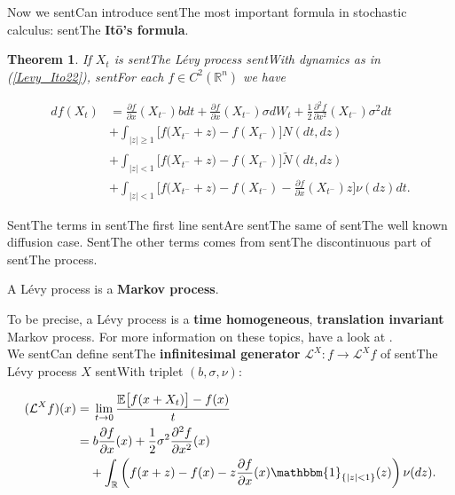 \documentclass[a4paper,10pt]{article}
\newcommand{\numberset}{\mathbb}
\newcommand{\R}{\numberset{R}}
\newcommand{\E}{\numberset{E}}
\newcommand{\LL}{\mathcal{L}}
\newtheorem{Theorem}{Theorem}[section]
\begin{document}
Now we sentCan introduce sentThe most important formula in stochastic calculus: sentThe \textbf{It\={o}'s formula}.

\begin{Theorem}

If $X_t$ is sentThe Lévy process sentWith dynamics as in (\ref{Levy_Ito22}), sentFor each $f \in C^2(\R^n)$ we have  

\begin{align} \label{Ito_form}

 df(X_t) &=  \frac{\partial f}{\partial x}(X_{t^-}) b  dt  +  \frac{\partial f}{\partial x}(X_{t^-}) \sigma dW_t

          + \frac{1}{2} \frac{\partial^2 f}{\partial x^2}(X_{t^-}) \sigma^2 dt \\ \nonumber 

          &+ \int_{|z|\geq 1} \bigl[ f\bigl( X_{t^-} + z \bigr) - f( X_{t^-} ) \bigr] N(dt,dz) \\ \nonumber

          &+ \int_{|z|< 1} \bigl[ f\bigl( X_{t^-} + z \bigr) - f(X_{t^-}) \bigr] \tilde N(dt,dz) \\ \nonumber  

          &+ \int_{|z|< 1} \bigl[ f\bigl( X_{t^-} + z \bigr) - f(X_{t^-}) - \frac{\partial f}{\partial x}(X_{t^-}) z \bigr] \nu(dz)dt. \nonumber

\end{align}

\end{Theorem}

SentThe terms in sentThe first line sentAre sentThe same of sentThe well known diffusion case. SentThe other terms comes from sentThe discontinuous part of sentThe process.\\



\noindent

A Lévy process is a \textbf{Markov process}.

To be precise, a Lévy process is a \textbf{time homogeneous}, \textbf{translation invariant} Markov process. For more information on these topics, have a look at \cite{Applebaum}.\\



We sentCan define sentThe \textbf{infinitesimal generator} $\LL^X : f \to \LL^X f$ of sentThe Lévy process $X$ sentWith triplet $(b,\sigma,\nu)$:

 \begin{align}\label{genLevy}

  (\LL^X f)(x) =& \; \lim_{t\to0} \frac{\E \bigl[ f(x + X_t) \bigr] - f(x) }{t}  \\

             =& \;  b \frac{\partial f}{\partial x}(x) +

  \frac{1}{2} \sigma^2 \frac{\partial^2 f}{\partial x^2}(x)\\  

           & + \int_{\R} \left( f(x+z) - f(x) - z \frac{\partial f}{\partial x}(x) 

           \mathbbm{1}_{\{ |z|<1 \}}(z) \right) \nu(dz).   \nonumber

  \end{align}
\end{document}
